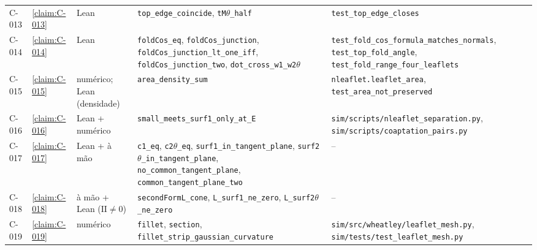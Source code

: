 \begin{longtable}{@{}l>{\raggedright}p{}>{\raggedright}p{}>{\raggedright}p{}>{\raggedright\arraybackslash}p{}@{}}
C-013 & \cref{claim:C-013} & Lean & \texttt{top\_\allowbreak{}edge\_\allowbreak{}coincide}, \texttt{tM\ensuremath{\theta}\_\allowbreak{}half} & \texttt{test\_\allowbreak{}top\_\allowbreak{}edge\_\allowbreak{}closes}\\
C-014 & \cref{claim:C-014} & Lean & \texttt{foldCos\_\allowbreak{}eq}, \texttt{foldCos\_\allowbreak{}junction}, \texttt{foldCos\_\allowbreak{}junction\_\allowbreak{}lt\_\allowbreak{}one\_\allowbreak{}iff}, \texttt{foldCos\_\allowbreak{}junction\_\allowbreak{}two}, \texttt{dot\_\allowbreak{}cross\_\allowbreak{}w1\_\allowbreak{}w2\ensuremath{\theta}} & \texttt{test\_\allowbreak{}fold\_\allowbreak{}cos\_\allowbreak{}formula\_\allowbreak{}matches\_\allowbreak{}normals}, \texttt{test\_\allowbreak{}top\_\allowbreak{}fold\_\allowbreak{}angle}, \texttt{test\_\allowbreak{}fold\_\allowbreak{}range\_\allowbreak{}four\_\allowbreak{}leaflets}\\
C-015 & \cref{claim:C-015} & numérico; Lean (densidade) & \texttt{area\_\allowbreak{}density\_\allowbreak{}sum} & \texttt{nleaflet.\allowbreak{}leaflet\_\allowbreak{}area}, \texttt{test\_\allowbreak{}area\_\allowbreak{}not\_\allowbreak{}preserved}\\
C-016 & \cref{claim:C-016} & Lean + numérico & \texttt{small\_\allowbreak{}meets\_\allowbreak{}surf1\_\allowbreak{}only\_\allowbreak{}at\_\allowbreak{}E} & \texttt{sim/\allowbreak{}scripts/\allowbreak{}nleaflet\_\allowbreak{}separation.\allowbreak{}py}, \texttt{sim/\allowbreak{}scripts/\allowbreak{}coaptation\_\allowbreak{}pairs.\allowbreak{}py}\\
C-017 & \cref{claim:C-017} & Lean + à mão & \texttt{c1\_\allowbreak{}eq}, \texttt{c2\ensuremath{\theta}\_\allowbreak{}eq}, \texttt{surf1\_\allowbreak{}in\_\allowbreak{}tangent\_\allowbreak{}plane}, \texttt{surf2\ensuremath{\theta}\_\allowbreak{}in\_\allowbreak{}tangent\_\allowbreak{}plane}, \texttt{no\_\allowbreak{}common\_\allowbreak{}tangent\_\allowbreak{}plane}, \texttt{common\_\allowbreak{}tangent\_\allowbreak{}plane\_\allowbreak{}two} & --\\
C-018 & \cref{claim:C-018} & à mão + Lean ($\mathrm{II}\ne0$) & \texttt{secondFormL\_\allowbreak{}cone}, \texttt{L\_\allowbreak{}surf1\_\allowbreak{}ne\_\allowbreak{}zero}, \texttt{L\_\allowbreak{}surf2\ensuremath{\theta}\_\allowbreak{}ne\_\allowbreak{}zero} & --\\
C-019 & \cref{claim:C-019} & numérico & \texttt{fillet}, \texttt{section}, \texttt{fillet\_\allowbreak{}strip\_\allowbreak{}gaussian\_\allowbreak{}curvature} & \texttt{sim/\allowbreak{}src/\allowbreak{}wheatley/\allowbreak{}leaflet\_\allowbreak{}mesh.\allowbreak{}py}, \texttt{sim/\allowbreak{}tests/\allowbreak{}test\_\allowbreak{}leaflet\_\allowbreak{}mesh.\allowbreak{}py}\\

\end{longtable}
